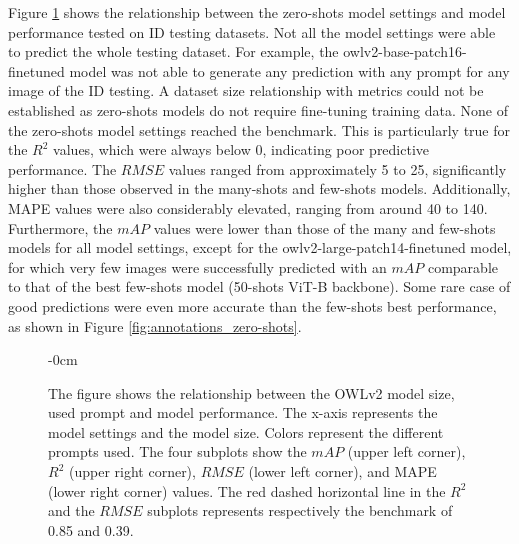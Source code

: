 \documentclass[12pt,a4paper,oneside]{report}
\newlength{\extralength}
\begin{document}
Figure \ref{fig:zeroshots_vs_performance} shows the relationship between the zero-shots 
model settings and model performance tested on ID testing datasets. Not all the 
model settings were able to predict the whole testing dataset. For example, the 
owlv2-base-patch16-finetuned model was not able to generate any prediction with 
any prompt for any image of the ID testing. A dataset size relationship with metrics 
could not be established as zero-shots models do not require fine-tuning training 
data.
None of the zero-shots model settings reached the benchmark. This is particularly true for the 
$R^2$ values, which were always below 0, indicating poor predictive performance. The 
$RMSE$ values ranged from approximately 5 to 25, significantly higher than those 
observed in the many-shots and few-shots models. Additionally, MAPE values were 
also considerably elevated, ranging from around 40 to 140. Furthermore, the 
$mAP$ values were lower than those of the many and few-shots models for all model 
settings, except for the owlv2-large-patch14-finetuned model, for which very few 
images were successfully predicted with an 
$mAP$ comparable to that of the best few-shots model (50-shots ViT-B backbone).
Some rare case of good predictions were even more accurate than the few-shots best performance, 
as shown in Figure \ref{fig:annotations_zero-shots}.

\begin{figure}[H]
  \centering
  \begin{adjustwidth}{-\extralength}{0cm}
  \caption{The figure shows the relationship between the OWLv2 model size, used prompt 
  and model performance.
  The x-axis represents the model settings and the model size.
  Colors represent the different prompts used.
  The four subplots show the $mAP$ (upper left corner), $R^2$ (upper right corner),
  $RMSE$ (lower left corner), and MAPE (lower right corner) values.
  The red dashed horizontal line in the $R^2$ and the $RMSE$ subplots represents 
  respectively the benchmark of 0.85 and 0.39. 
  }
  \label{fig:zeroshots_vs_performance}
\end{adjustwidth}
\end{figure}
\end{document}
